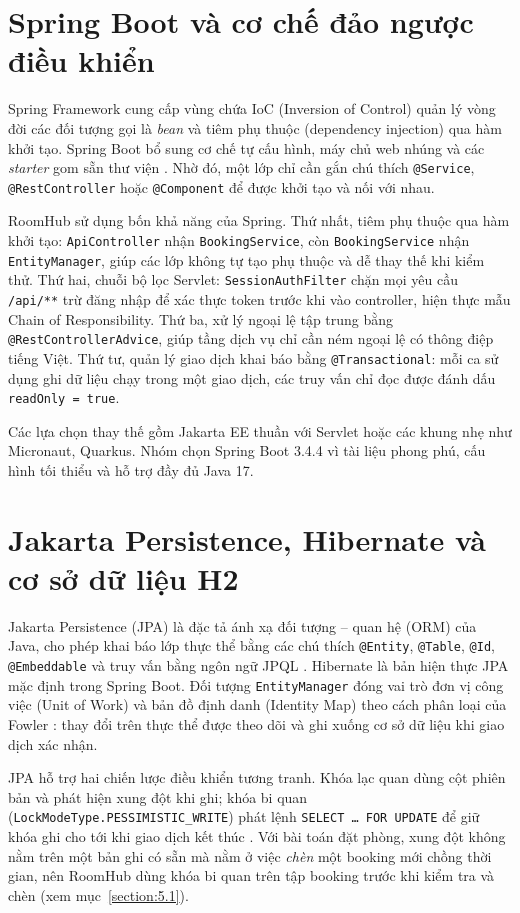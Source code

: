 \documentclass[../DoAn.tex]{subfiles}
\begin{document}
\section{Spring Boot và cơ chế đảo ngược điều khiển}
\label{section:3.2}
Spring Framework cung cấp vùng chứa IoC (Inversion of Control) quản lý vòng đời các đối tượng gọi là \emph{bean} và tiêm phụ thuộc (dependency injection) qua hàm khởi tạo. Spring Boot bổ sung cơ chế tự cấu hình, máy chủ web nhúng và các \emph{starter} gom sẵn thư viện \cite{springboot34}. Nhờ đó, một lớp chỉ cần gắn chú thích \texttt{@Service}, \texttt{@RestController} hoặc \texttt{@Component} để được khởi tạo và nối với nhau.

RoomHub sử dụng bốn khả năng của Spring. Thứ nhất, tiêm phụ thuộc qua hàm khởi tạo: \texttt{ApiController} nhận \texttt{BookingService}, còn \texttt{BookingService} nhận \texttt{EntityManager}, giúp các lớp không tự tạo phụ thuộc và dễ thay thế khi kiểm thử. Thứ hai, chuỗi bộ lọc Servlet: \texttt{SessionAuthFilter} chặn mọi yêu cầu \texttt{/api/**} trừ đăng nhập để xác thực token trước khi vào controller, hiện thực mẫu Chain of Responsibility. Thứ ba, xử lý ngoại lệ tập trung bằng \texttt{@RestControllerAdvice}, giúp tầng dịch vụ chỉ cần ném ngoại lệ có thông điệp tiếng Việt. Thứ tư, quản lý giao dịch khai báo bằng \texttt{@Transactional}: mỗi ca sử dụng ghi dữ liệu chạy trong một giao dịch, các truy vấn chỉ đọc được đánh dấu \texttt{readOnly = true}.

Các lựa chọn thay thế gồm Jakarta EE thuần với Servlet hoặc các khung nhẹ như Micronaut, Quarkus. Nhóm chọn Spring Boot 3.4.4 vì tài liệu phong phú, cấu hình tối thiểu và hỗ trợ đầy đủ Java 17.

\section{Jakarta Persistence, Hibernate và cơ sở dữ liệu H2}
\label{section:3.3}
Jakarta Persistence (JPA) là đặc tả ánh xạ đối tượng -- quan hệ (ORM) của Java, cho phép khai báo lớp thực thể bằng các chú thích \texttt{@Entity}, \texttt{@Table}, \texttt{@Id}, \texttt{@Embeddable} và truy vấn bằng ngôn ngữ JPQL \cite{jakartapersistence31}. Hibernate là bản hiện thực JPA mặc định trong Spring Boot. Đối tượng \texttt{EntityManager} đóng vai trò đơn vị công việc (Unit of Work) và bản đồ định danh (Identity Map) theo cách phân loại của Fowler \cite{fowler2002peaa}: thay đổi trên thực thể được theo dõi và ghi xuống cơ sở dữ liệu khi giao dịch xác nhận.

JPA hỗ trợ hai chiến lược điều khiển tương tranh. Khóa lạc quan dùng cột phiên bản và phát hiện xung đột khi ghi; khóa bi quan (\texttt{LockModeType.PESSIMISTIC\_WRITE}) phát lệnh \texttt{SELECT \ldots{} FOR UPDATE} để giữ khóa ghi cho tới khi giao dịch kết thúc \cite{bernstein2009transaction}. Với bài toán đặt phòng, xung đột không nằm trên một bản ghi có sẵn mà nằm ở việc \emph{chèn} một booking mới chồng thời gian, nên RoomHub dùng khóa bi quan trên tập booking trước khi kiểm tra và chèn (xem mục~\ref{section:5.1}).
\end{document}
